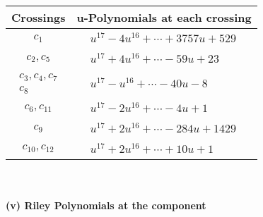 \documentclass[1p]{elsarticle_modified}
\theoremstyle{definition}
\begin{document}
\begin{tabular}{m{50pt}|m{274pt}}
Crossings & \hspace{64pt}u-Polynomials at each crossing \\
\hline $$\begin{aligned}c_{1}\end{aligned}$$&$\begin{aligned}
&u^{17}-4 u^{16}+\cdots+3757 u+529
\end{aligned}$\\
\hline $$\begin{aligned}c_{2},c_{5}\end{aligned}$$&$\begin{aligned}
&u^{17}+4 u^{16}+\cdots-59 u+23
\end{aligned}$\\
\hline $$\begin{aligned}c_{3},c_{4},c_{7}\\c_{8}\end{aligned}$$&$\begin{aligned}
&u^{17}- u^{16}+\cdots-40 u-8
\end{aligned}$\\
\hline $$\begin{aligned}c_{6},c_{11}\end{aligned}$$&$\begin{aligned}
&u^{17}-2 u^{16}+\cdots-4 u+1
\end{aligned}$\\
\hline $$\begin{aligned}c_{9}\end{aligned}$$&$\begin{aligned}
&u^{17}+2 u^{16}+\cdots-284 u+1429
\end{aligned}$\\
\hline $$\begin{aligned}c_{10},c_{12}\end{aligned}$$&$\begin{aligned}
&u^{17}+2 u^{16}+\cdots+10 u+1
\end{aligned}$\\
\hline
\end{tabular}\\~\\
\newpage\renewcommand{\arraystretch}{1}
\flushleft \textbf{(v) Riley Polynomials at the component}\newline \\
\end{document}
